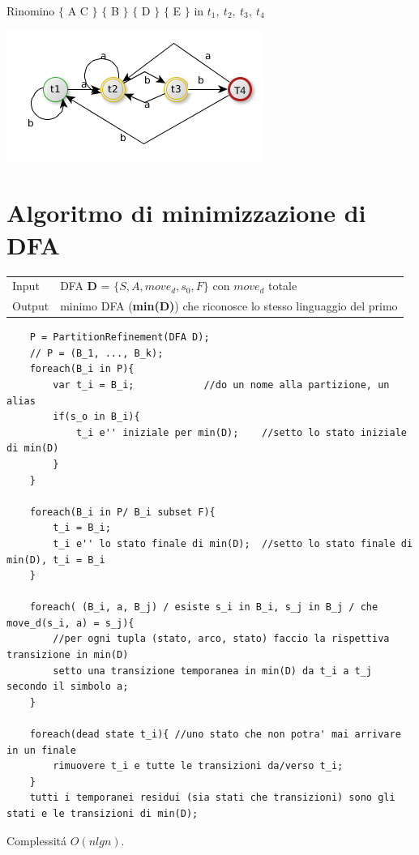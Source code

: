 Rinomino  $\{$ A C $\}$ $\{$ B $\}$ $\{$ D $\}$ $\{$ E $\}$ in $t_1,\ t_2,\ t_3,\ t_4 $

\begin{center}
	\includegraphics[scale=0.5]{Chapters/Img/c02_06.png}\\
\end{center} 

\section{Algoritmo di minimizzazione di DFA}
\begin{center}
    \begin{tabular}{ll}
        Input   &   DFA \textbf{D} = $\{ S,A,move_d, s_0, F\}$ con $move_d$ totale\\
        Output  &   minimo DFA (\textbf{min(D)}) che riconosce lo stesso linguaggio del primo\\ 
    \end{tabular}
\end{center}

\begin{lstlisting}
    P = PartitionRefinement(DFA D);
    // P = (B_1, ..., B_k);
    foreach(B_i in P){
        var t_i = B_i;            //do un nome alla partizione, un alias
        if(s_o in B_i){
            t_i e'' iniziale per min(D);    //setto lo stato iniziale di min(D)
        }
    }

    foreach(B_i in P/ B_i subset F){
        t_i = B_i;
        t_i e'' lo stato finale di min(D);  //setto lo stato finale di min(D), t_i = B_i 
    }

    foreach( (B_i, a, B_j) / esiste s_i in B_i, s_j in B_j / che move_d(s_i, a) = s_j){
        //per ogni tupla (stato, arco, stato) faccio la rispettiva transizione in min(D)
        setto una transizione temporanea in min(D) da t_i a t_j secondo il simbolo a;
    }

    foreach(dead state t_i){ //uno stato che non potra' mai arrivare in un finale
        rimuovere t_i e tutte le transizioni da/verso t_i;
    }
    tutti i temporanei residui (sia stati che transizioni) sono gli stati e le transizioni di min(D);
\end{lstlisting}
Complessit\'a $O(nlgn)$.

